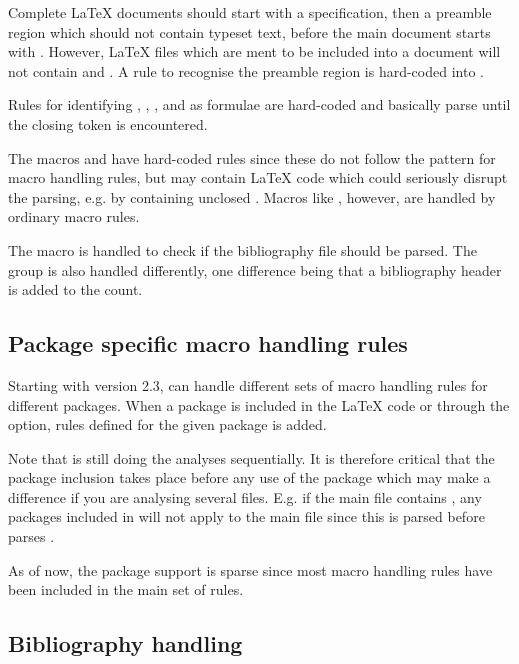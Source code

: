 \documentclass{article}
\begin{document}
Complete \LaTeX{} documents should start with a  specification, then a preamble region which should not contain typeset text, before the main document starts with . However, \LaTeX{} files which are ment to be included into a document will not contain  and . A rule to recognise the preamble region is hard-coded into \TeXcount{}.

Rules for identifying \code{\$\ldots\$}, \code{\$\$\ldots\$\$}, \code{\bs(\ldots\bs)}, and \code{\bs[\ldots\bs]} as formulae are hard-coded and basically parse until the closing token is encountered.

The macros  and  have hard-coded rules since these do not follow the pattern for macro handling rules, but may contain \LaTeX{} code which could seriously disrupt the parsing, e.g. by containing unclosed . Macros like , however, are handled by ordinary macro rules.

The macro  is handled to check if the bibliography file should be parsed. The  group is also handled differently, one difference being that a bibliography header is added to the count.

\subsection{Package specific macro handling rules}

Starting with version 2.3, \TeXcount{} can handle different sets of macro handling rules for different packages. When a package is included in the \LaTeX{} code or through the  option, rules defined for the given package is added.

Note that \TeXcount{} is still doing the analyses sequentially. It is therefore critical that the package inclusion takes place before any use of the package which may make a difference if you are analysing several files. E.g. if the main file contains , any packages included in  will not apply to the main file since this is parsed before \TeXcount{} parses .

As of now, the package support is sparse since most macro handling rules have been included in the main set of rules.

\subsection{Bibliography handling}
\end{document}
